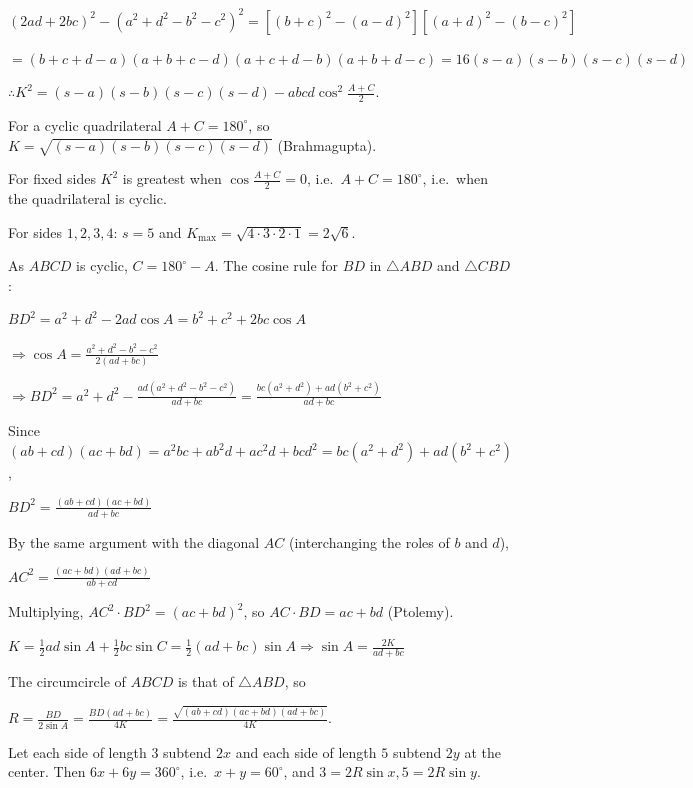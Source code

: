   $(2ad + 2bc)^2 - (a^2 + d^2 - b^2 - c^2)^2 = [(b + c)^2 - (a - d)^2][(a + d)^2 - (b - c)^2]$

  $= (b + c + d - a)(a + b + c - d)(a + c + d - b)(a + b + d - c) = 16(s - a)(s - b)(s - c)(s - d)$

  $\therefore K^2 = (s - a)(s - b)(s - c)(s - d) - abcd\cos^2\frac{A + C}{2}$.

  For a cyclic quadrilateral $A + C = 180^\circ$, so $K = \sqrt{(s - a)(s - b)(s - c)(s - d)}$
  (Brahmagupta).

  For fixed sides $K^2$ is greatest when $\cos\frac{A + C}{2} = 0$, i.e.\ $A + C = 180^\circ$, i.e.\ when the
  quadrilateral is cyclic.

  For sides $1, 2, 3, 4$: $s = 5$ and $K_{\max} = \sqrt{4\cdot3\cdot2\cdot1} = 2\sqrt{6}$.
\item As $ABCD$ is cyclic, $C = 180^\circ - A$. The cosine rule for $BD$ in $\triangle ABD$ and $\triangle
  CBD$:

  $BD^2 = a^2 + d^2 - 2ad\cos A = b^2 + c^2 + 2bc\cos A$

  $\Rightarrow \cos A = \frac{a^2 + d^2 - b^2 - c^2}{2(ad + bc)}$

  $\Rightarrow BD^2 = a^2 + d^2 - \frac{ad(a^2 + d^2 - b^2 - c^2)}{ad + bc} = \frac{bc(a^2 + d^2) + ad(b^2 +
  c^2)}{ad + bc}$

  Since $(ab + cd)(ac + bd) = a^2bc + ab^2d + ac^2d + bcd^2 = bc(a^2 + d^2) + ad(b^2 + c^2)$,

  $BD^2 = \frac{(ab + cd)(ac + bd)}{ad + bc}$

  By the same argument with the diagonal $AC$ (interchanging the roles of $b$ and $d$),

  $AC^2 = \frac{(ac + bd)(ad + bc)}{ab + cd}$

  Multiplying, $AC^2\cdot BD^2 = (ac + bd)^2$, so $AC\cdot BD = ac + bd$ (Ptolemy).

  $K = \frac{1}{2}ad\sin A + \frac{1}{2}bc\sin C = \frac{1}{2}(ad + bc)\sin A\Rightarrow \sin A =
  \frac{2K}{ad + bc}$

  The circumcircle of $ABCD$ is that of $\triangle ABD$, so

  $R = \frac{BD}{2\sin A} = \frac{BD(ad + bc)}{4K} = \frac{\sqrt{(ab + cd)(ac + bd)(ad + bc)}}{4K}$.
\item Let each side of length $3$ subtend $2x$ and each side of length $5$ subtend $2y$ at the center. Then
  $6x + 6y = 360^\circ$, i.e.\ $x + y = 60^\circ$, and $3 = 2R\sin x, 5 = 2R\sin y$.

